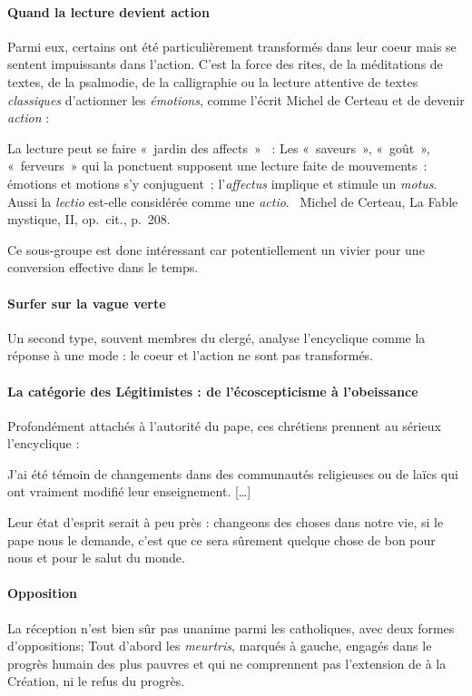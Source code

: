 \paragraph{Quand la lecture devient action}
Parmi eux, certains ont été particulièrement transformés dans leur coeur mais se sentent impuissants dans l'action. C'est la force des rites, de la méditations de textes, de la psalmodie, de la calligraphie ou la lecture attentive de textes \textit{classiques} d'actionner les \textit{émotions}, comme l'écrit Michel de Certeau et de devenir \textit{action} : 
\begin{singlequote}
    La lecture peut se faire « jardin des affects »  : Les « saveurs », « goût », « ferveurs » qui la ponctuent supposent une lecture faite de mouvements : émotions et motions s’y conjuguent ; l’\textit{affectus} implique et stimule un \textit{motus}. Aussi la \textit{lectio} est-elle considérée comme une \textit{actio}.   Michel de Certeau, La Fable mystique, II, op. cit., p. 208. 
 
\end{singlequote}
Ce sous-groupe est donc intéressant car potentiellement un vivier pour une conversion effective dans le temps. 

\paragraph{Surfer sur la vague verte} Un second type, souvent membres du clergé, analyse l'encyclique comme la réponse à une mode : le coeur et l'action ne sont pas transformés.
 
\paragraph{La catégorie des Légitimistes : de l'écoscepticisme à l'obeissance} Profondément attachés à l'autorité du pape, ces chrétiens prennent au sérieux l'encyclique : 
\begin{singlequote}
 
J'ai été témoin de changements dans des communautés religieuses ou de laïcs qui ont vraiment modifié leur enseignement.  [\ldots]

Leur état d'esprit serait à peu près : changeons des choses dans notre vie, si le pape nous le demande, c'est que ce sera sûrement quelque chose de bon pour nous et pour le salut du monde. \cite{revol_reception_2017}
\end{singlequote}
\paragraph{Opposition} La réception n'est bien sûr pas unanime parmi les catholiques, avec deux formes d'oppositions;
Tout d'abord les \textit{meurtris},  marqués à gauche, engagés dans le progrès humain des plus pauvres et qui ne comprennent pas l'extension de \LS à la Création, ni le refus du progrès. 

